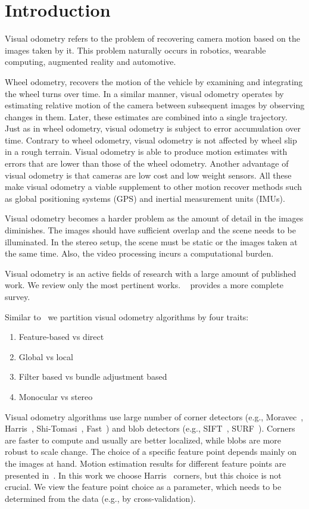 \documentclass{report}
\begin{document}
\chapter{Introduction}

Visual odometry refers to the problem of recovering camera motion
based on the images taken by it. This problem naturally occurs in
robotics, wearable computing, augmented reality and automotive.

Wheel odometry, recovers the motion of the vehicle by examining and
integrating the wheel turns over time.  In a similar manner, visual
odometry operates by estimating relative motion of the camera between
subsequent images by observing changes in them. Later, these estimates
are combined into a single trajectory. Just as in wheel odometry,
visual odometry is subject to error accumulation over time. Contrary
to wheel odometry, visual odometry is not affected by wheel slip in a
rough terrain. Visual odometry is able to produce motion estimates
with errors that are lower than those of the wheel odometry. Another
advantage of visual odometry is that cameras are low cost and low
weight sensors.  All these make visual odometry a viable supplement to
other motion recover methods such as global positioning systems (GPS)
and inertial measurement units (IMUs).

Visual odometry becomes a harder problem as the amount of detail in
the images diminishes. The images should have sufficient overlap and
the scene needs to be illuminated.  In the stereo setup, the scene
must be static or the images taken at the same time. Also, the video
processing incurs a computational burden.

Visual odometry is an active fields of research with a large amount of
published work.  We review only the most pertinent works.
~\cite{Scaramuzza2011} provides a more complete survey.

Similar to~\cite{Persson2015} we partition visual odometry algorithms
by four traits:
\begin{enumerate}
\item Feature-based vs direct
\item Global vs local
\item Filter based vs bundle adjustment based
\item Monocular vs stereo
\end{enumerate}

Visual odometry algorithms use large number of corner detectors (e.g.,
Moravec~\cite{Moravec1980}, Harris~\cite{Harris1987},
Shi-Tomasi~\cite{Shi1994}, Fast~\cite{Rosten2006}) and blob detectors
(e.g., SIFT~\cite{Lowe2004}, SURF~\cite{Bay2006}). Corners are faster
to compute and usually are better localized, while blobs are more
robust to scale change. The choice of a specific feature point depends
mainly on the images at hand.  Motion estimation results for different
feature points are presented in~\cite{Govender2009}. In this work we
choose Harris~\cite{Harris1987} corners, but this choice is not
crucial. We view the feature point choice as a parameter, which needs
to be determined from the data (e.g., by cross-validation).
\end{document}
